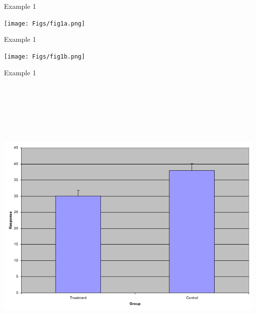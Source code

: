 \documentclass[12pt]{article}
\newcommand{\headsize}{\fontsize{35}{35} \selectfont}
\begin{document}
\newpage


\headsize \color{yellow}
\hfill \begin{minipage}{5.75in}
\centering
Example 1
\end{minipage}

\vspace{30mm}

\centerline{\texttt{[image: Figs/fig1a.png]}}




\newpage


\headsize \color{yellow}
\hfill \begin{minipage}{5.75in}
\centering
Example 1
\end{minipage}

\vspace{30mm}

\centerline{\texttt{[image: Figs/fig1b.png]}}



\newpage


\headsize \color{yellow}
\hfill \begin{minipage}{5.75in}
\centering
Example 1
\end{minipage}

\vspace{30mm}

\centerline{\includegraphics[height=6in]{Figs/fig1c.png}}
\end{document}
